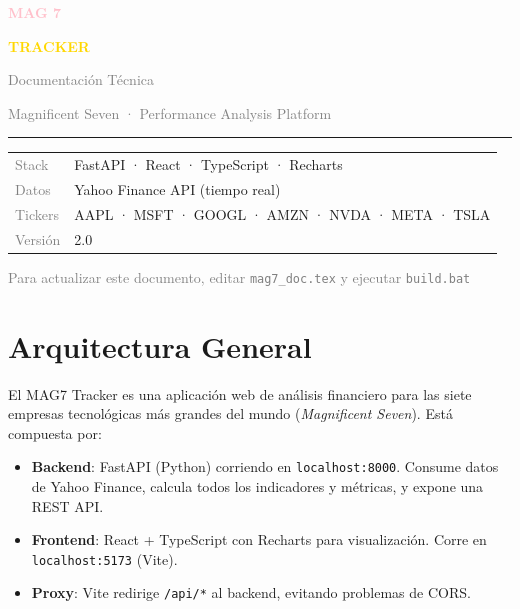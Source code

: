 \documentclass[11pt, a4paper]{article}
\newcommand{\code}[1]{\texttt{#1}}
\begin{document}
\begin{titlepage}
  \centering
  \vspace*{3cm}
  {\fontsize{36}{44}\selectfont\bfseries\textcolor{pink}{MAG 7}\par}
  {\fontsize{36}{44}\selectfont\bfseries\textcolor{gold}{TRACKER}\par}
  \vspace{0.8cm}
  {\large\textcolor{gray}{Documentación Técnica}\par}
  \vspace{0.4cm}
  {\normalsize\textcolor{gray}{Magnificent Seven · Performance Analysis Platform}\par}
  \vspace{2cm}
  \rule{8cm}{0.4pt}
  \vspace{1cm}

  \begin{tabular}{ll}
    \textcolor{gray}{Stack}    & FastAPI · React · TypeScript · Recharts \\[4pt]
    \textcolor{gray}{Datos}    & Yahoo Finance API (tiempo real) \\[4pt]
    \textcolor{gray}{Tickers}  & AAPL · MSFT · GOOGL · AMZN · NVDA · META · TSLA \\[4pt]
    \textcolor{gray}{Versión}  & 2.0 \\
  \end{tabular}

  \vfill
  {\small\textcolor{gray}{Para actualizar este documento, editar \texttt{mag7\_doc.tex} y ejecutar \texttt{build.bat}}}
\end{titlepage}

\tableofcontents
\newpage

\section{Arquitectura General}

El MAG7 Tracker es una aplicación web de análisis financiero para las siete empresas tecnológicas más grandes del mundo (\textit{Magnificent Seven}). Está compuesta por:

\begin{itemize}[leftmargin=1.5cm]
  \item \textbf{Backend}: FastAPI (Python) corriendo en \code{localhost:8000}. Consume datos de Yahoo Finance, calcula todos los indicadores y métricas, y expone una REST API.
  \item \textbf{Frontend}: React + TypeScript con Recharts para visualización. Corre en \code{localhost:5173} (Vite).
  \item \textbf{Proxy}: Vite redirige \code{/api/*} al backend, evitando problemas de CORS.
\end{itemize}
\end{document}
